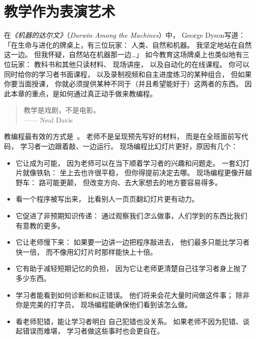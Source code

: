 \chapter{教学作为表演艺术}\label{s:performance}

在\emph{《机器的达尔文》}（\emph{Darwin Among the Machines}）中，
George Dyson写道：
「在生命与进化的牌桌上，有三位玩家：
人类、自然和机器。
我坚定地站在自然这一边。
但我怀疑，自然站在机器那一边{\ldots}」
如今教育这场牌桌上也类似地有三位玩家：
教科书和其他只读材料、
现场讲座，
以及自动化的在线课程。
你可以同时给你的学习者书面课程，
以及录制视频和自主进度练习的某种组合，
但如果你要当面授课，
你就必须提供某种不同于（并且希望能好于）这两者的东西。
因此本章的重点，是如何通过真正动手做来教编程。


\begin{quote}

  教学是戏剧，不是电影。\\
  —— Neal Davis

\end{quote}

教编程最有效的方式是~\cite{Rubi2013,Haar2017,Raj2018}。
老师不是呈现预先写好的材料，
而是在全班面前写代码，
学习者一边跟着敲、一边运行。
现场编程比幻灯片更好，原因有几个：

\begin{itemize}

\item
  它让成为可能，
  因为老师可以在当下顺着学习者的兴趣和问题走。
  一套幻灯片就像铁轨：
  坐上去也许很平稳，
  但你得提前决定去哪。
  现场编程更像开越野车：
  路可能更颠，
  但改变方向、去大家想去的地方要容易得多。

\item
  看一个程序被写出来，
  比看别人一页页翻幻灯片更有动力。

\item
  它促进了非预期知识传递：
  通过观察我们\emph{怎么}做事，人们学到的东西比我们有意教的更多。

\item
  它让老师慢下来：
  如果要一边讲一边把程序敲进去，
  他们最多只能比学习者快一倍，
  而不像用幻灯片时那样能快上十倍。

\item
  它有助于减轻短期记忆的负担，
  因为它让老师更清楚自己往学习者身上抛了多少东西。

\item
  学习者能看到如何诊断和纠正错误。
  他们将来会花大量时间做这件事；
  除非你是完美的打字员，
  现场编程能确保他们看到该怎么做。

\item
  看老师犯错，能让学习者明白
  自己犯错也没关系。
  如果老师不因为犯错、谈起错误而难堪，
  学习者做这些事时也会更自在。

\end{itemize}

